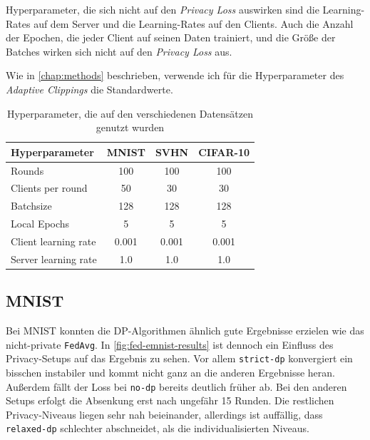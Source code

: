 Hyperparameter, die sich nicht auf den \textit{Privacy Loss} auswirken sind die Learning-Rates auf dem Server und die Learning-Rates auf den Clients. Auch die Anzahl der Epochen, die jeder Client auf seinen Daten trainiert, und die Größe der Batches wirken sich nicht auf den \textit{Privacy Loss} aus.

Wie in \autoref{chap:methods} beschrieben, verwende ich für die Hyperparameter des \textit{Adaptive Clippings} die Standardwerte.

\begin{table}[tb]
	\centering
	\begin{tabular}{lccc}
		\toprule
		Hyperparameter & MNIST & SVHN & CIFAR-10 \\
		\midrule
		Rounds & 100 & 100 & 100 \\
		Clients per round & 50 & 30 & 30 \\
		Batchsize & 128 & 128 & 128 \\
		Local Epochs & 5 & 5 & 5 \\
		Client learning rate & 0.001 & 0.001 & 0.001 \\
		Server learning rate & 1.0 & 1.0 & 1.0 \\
		\bottomrule
	\end{tabular}
	\caption{Hyperparameter, die auf den verschiedenen Datensätzen genutzt wurden}
	\label{tab:fl-hyperparameters}
\end{table}

\subsection{MNIST}

Bei MNIST konnten die DP-Algorithmen ähnlich gute Ergebnisse erzielen wie das nicht-private \texttt{FedAvg}. In \autoref{fig:fed-emnist-results} ist dennoch ein Einfluss des Privacy-Setups auf das Ergebnis zu sehen. Vor allem \texttt{strict-dp} konvergiert ein bisschen instabiler und kommt nicht ganz an die anderen Ergebnisse heran. Außerdem fällt der Loss bei \texttt{no-dp} bereits deutlich früher ab. Bei den anderen Setups erfolgt die Absenkung erst nach ungefähr 15 Runden. Die restlichen Privacy-Niveaus liegen sehr nah beieinander, allerdings ist auffällig, dass \texttt{relaxed-dp} schlechter abschneidet, als die individualisierten Niveaus.

